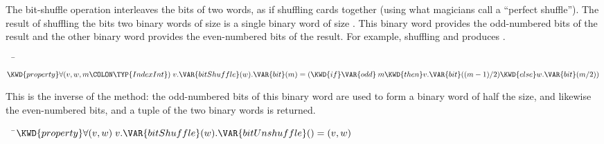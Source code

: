 
The bit-shuffle operation interleaves the bits of two words, as if shuffling cards together
(using what magicians call a ``perfect shuffle'').
The result of shuffling the bits two binary words of size  is a single binary
word of size .
This binary word provides the odd-numbered bits of the result
and the other binary word provides the even-numbered bits of the result.
For example, shuffling  and  produces .

\begin{Fortress}
{\tt~~}\pushtabs\=\+\(  \KWD{property} \forall(v, w, m\COLON \TYP{IndexInt})\; v.\VAR{bitShuffle}(w).\VAR{bit}(m) = (\KWD{if} \VAR{odd}\mskip 4mu plus 4mu{m} \KWD{then} v.\VAR{bit}((m-1)/2) \KWD{else} w.\VAR{bit}(m/2))\)\-\\\poptabs
\end{Fortress}



This is the inverse of the  method: the odd-numbered bits of this binary word
are used to form a binary word of half the size, and likewise the even-numbered bits,
and a tuple of the two binary words is returned.

\begin{Fortress}
{\tt~~}\pushtabs\=\+\(  \KWD{property} \forall(v,w)\; v.\VAR{bitShuffle}(w).\VAR{bitUnshuffle}() = (v,w)\)\-\\\poptabs
\end{Fortress}



